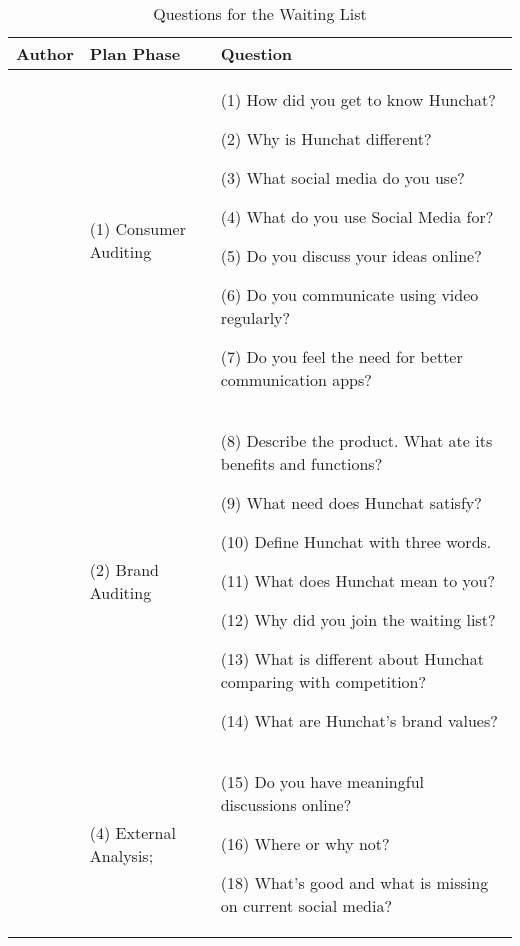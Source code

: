 \documentclass[12pt]{article}
\begin{document}
\begin{table}[htbp]
\small
\caption{Questions for the Waiting List}
\label{table:wl}
\centering
\begin{tabular}{ @{}P{0.15\textwidth}P{0.2\textwidth}P{0.6\textwidth}@{} }
Author                             & Plan Phase             & Question                                                                                                                                                                                                                                                                                                                                                      \\ \hline
{} & (1) Consumer Auditing  & (1) How did you get to know Hunchat? \par (2) Why is Hunchat different?\par (3) What social media do you use?\par (4) What do you use Social Media for? \par (5) Do you discuss your ideas online? \par (6) Do you communicate using video regularly? \par (7) Do you feel the need for better communication apps?                                                                                                                  \\
                                   & (2) Brand Auditing     & (8) Describe the product. What ate its benefits and functions?\par (9) What need does Hunchat satisfy?\par (10) Define Hunchat with three words.\par  (11) What does Hunchat mean to you?\par (12) Why did you join the waiting list?\par (13) What is different about Hunchat comparing with competition?\par (14) What are Hunchat's brand values? \\ \hline
\cite{clow}    & (4) External Analysis; & (15) Do you have meaningful discussions online? \par (16) Where or why not? \par (18) What's good and what is missing on current social media?                                                                                                                                                                                                                                                                                                               \\

\end{tabular}
\end{table}
\end{document}
